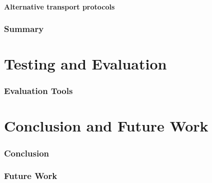 \documentclass[USenglish]{article}
\begin{document}
\subsection{Alternative transport protocols}

\section{Summary}

\part{Testing and Evaluation}
\section{Evaluation Tools}

\part{Conclusion and Future Work}
\section{Conclusion}

\section{Future Work}

\pagebreak
\printbibliography{}
\printglossary
\end{document}
